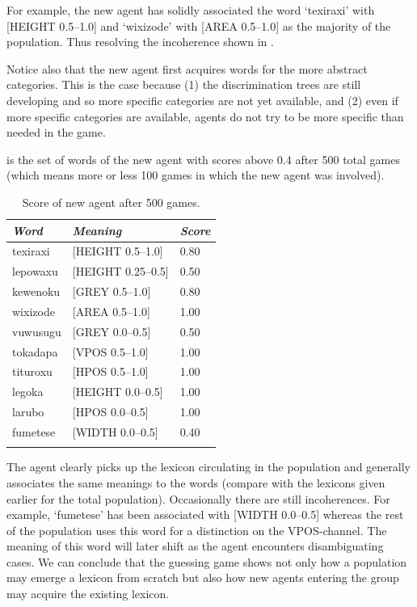 For example, the new agent
has solidly associated the word `texiraxi' with 
{}[HEIGHT 0.5–1.0] and `wixizode' with [AREA 0.5–1.0]
as the majority of the population. Thus resolving the 
incoherence shown in . 

Notice also that the new agent first acquires words 
for the more abstract categories. This is the case 
because (1) the discrimination trees are still developing
and so more specific categories are not yet available, 
and (2) even if more specific categories are available, 
agents do not try to be more specific than needed in 
the game. 

 is the set of words of the new agent
with scores above 0.4 after 
500 total games (which means more or less 100 games 
in which the new agent was involved). 


\begin{table}
\begin{center}
\begin{tabular}{ l  l  l }
\lsptoprule
{\itshape Word} & {\itshape Meaning} & {\itshape Score} \\ \midrule
texiraxi &  [HEIGHT 0.5–1.0] & 0.80 \\ 
lepowaxu &  [HEIGHT 0.25–0.5] & 0.50 \\ 
kewenoku &  [GREY 0.5–1.0] & 0.80 \\ 
wixizode & [AREA 0.5–1.0] & 1.00 \\ 
vuwusugu & [GREY 0.0–0.5] & 0.50 \\ 
tokadapa &  [VPOS 0.5–1.0] & 1.00 \\ 
tituroxu &  [HPOS 0.5–1.0] & 1.00 \\ 
legoka   &  [HEIGHT 0.0–0.5] & 1.00 \\ 
larubo   &  [HPOS 0.0–0.5] & 1.00 \\ 
fumetese &  [WIDTH 0.0–0.5] & 0.40 \\ 
\lspbottomrule
\end{tabular}
\caption{\label{tab:newagents}Score of new agent after 500 games.}
\end{center}
\end{table}
The agent clearly picks up the lexicon circulating
in the population and generally associates the 
same meanings to the words (compare with the 
lexicons given earlier for the total population). 
Occasionally there are still incoherences. For example, 
`fumetese' has been associated with [WIDTH 0.0–0.5] 
whereas the rest of the population uses this word
for a distinction on the VPOS-channel. The meaning
of this word will later shift as the agent encounters
disambiguating cases. We can conclude that the 
guessing game shows not only how a population may 
emerge a lexicon from scratch but also how new 
agents entering the group may acquire the existing 
lexicon.  

